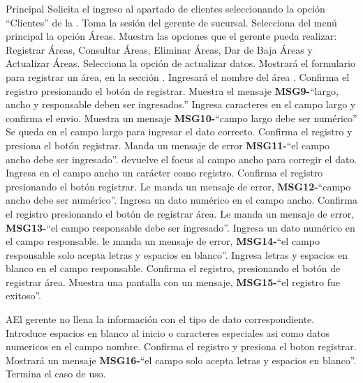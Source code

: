 	\begin{UCtrayectoria}{Principal}
		\UCpaso[\UCactor] Solicita el ingreso al apartado de clientes seleccionando la opción ``Clientes'' de la .
		\UCpaso Toma la sesión del gerente de sucursal.
		\UCpaso[\UCactor] Selecciona del menú principal la opción Áreas.
		\UCpaso Muestra las opciones que el gerente pueda realizar: Registrar Áreas, Consultar Áreas, Eliminar Áreas, Dar de Baja Áreas y Actualizar Áreas.
		\UCpaso[\UCactor] Selecciona la opción de actualizar datos.
		\UCpaso Mostrará el formulario para registrar un área, en la sección  .		
		\UCpaso[\UCactor] Ingresará el nombre del área .
		\UCpaso[\UCactor] Confirma el registro presionando el botón de registrar.
		\UCpaso Muestra el mensaje {\bf MSG9-}``largo, ancho y responsable deben ser ingresados.'' 	
		\UCpaso[\UCactor] Ingresa caracteres en el campo largo y confirma el envio.
		\UCpaso Muestra un mensaje {\bf MSG10-}``campo largo debe ser numérico''
		\UCpaso Se queda en el campo largo para ingresar el dato correcto.
		\UCpaso[\UCactor] Confirma el registro y presiona el botón registrar.
		\UCpaso Manda un mensaje de error {\bf MSG11-}``el campo ancho debe ser ingresado''.
		\UCpaso devuelve el focus al campo ancho para corregir el dato.
		\UCpaso[\UCactor] Ingresa en el campo ancho un carácter como registro.
		\UCpaso[\UCactor] Confirma el registro presionando el botón registrar.
		\UCpaso Le manda un mensaje de error, {\bf MSG12-}``campo ancho debe ser numérico''.
		\UCpaso[\UCactor] Ingresa un dato numérico en el campo ancho.
		\UCpaso[\UCactor] Confirma el registro presionando el botón  de registrar área.
		\UCpaso Le manda un mensaje de error, {\bf MSG13-}``el campo responsable debe ser ingresado''.
		\UCpaso[\UCactor] Ingresa un dato numérico en el campo responsable.
		\UCpaso le manda un mensaje de error, {\bf MSG14-}``el campo responsable solo acepta letras y espacios en blanco''. 
		\UCpaso[\UCactor] Ingresa letras y espacios en blanco en el campo responsable.
		\UCpaso[\UCactor] Confirma el registro, presionando el botón de registrar área.
		\UCpaso Muestra una pantalla con un mensaje, {\bf MSG15-}``el registro fue exitoso''.
	\end{UCtrayectoria}
		
		\begin{UCtrayectoriaA}{A}{El gerente no llena la información con el tipo de dato correspondiente.}
			\UCpaso[\UCactor] Introduce espacios en blanco al inicio o caracteres especiales asi como datos numericos en el campo nombre.
			\UCpaso[\UCactor] Confirma el registro y presiona el boton registrar.
			\UCpaso Mostrará un mensaje  {\bf MSG16-}``el campo solo acepta letras y espacios en blanco''.
			\UCpaso[] Termina el caso de uso.
		\end{UCtrayectoriaA}